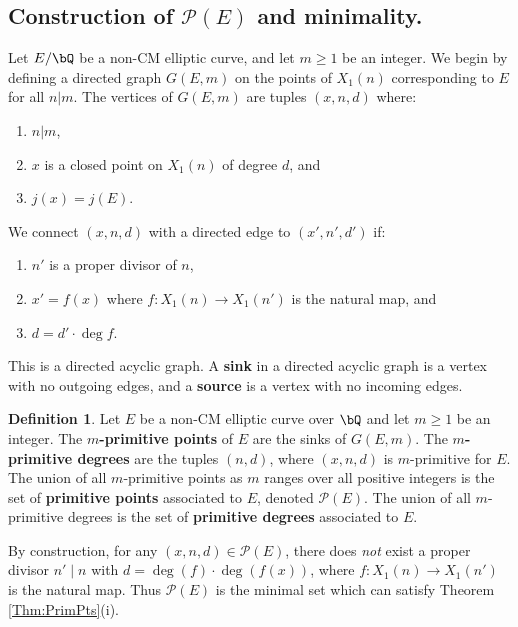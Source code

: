 \documentclass[11pt,reqno]{amsart}
\theoremstyle{plain}
\theoremstyle{definition}
\newtheorem{definition}[theorem]{Definition}
\newcommand{\Q}{\bQ}
\begin{document}
\subsection{\texorpdfstring{Construction of $\mathcal{P}(E)$ and minimality.}{Construction of P(E) and minimality}} Let $E/\Q$ be a non-CM elliptic curve, and let $m\geq 1$ be an integer.
We begin by defining a directed graph $G(E,m)$ on the points of $X_1(n)$ corresponding to $E$ for all $n|m$. The vertices of $G(E,m)$ are tuples $(x,n,d)$ where:
\begin{enumerate}
    \item $n|m$,
    \item $x$ is a closed point on $X_1(n)$ of degree $d$, and
    \item $j(x)=j(E)$.
\end{enumerate}
We connect $(x,n,d)$ with a directed edge to $(x',n',d')$ if:
\begin{enumerate}
    \item $n'$ is a proper divisor of $n$,
    \item $x'=f(x)$ where $f\colon X_1(n)\to X_1(n')$ is the natural map, and
    \item $d=d'\cdot \deg f$.
\end{enumerate}


This is a directed acyclic graph. A \textbf{sink} in a directed acyclic graph is a vertex with no outgoing edges, and a \textbf{source} is a vertex with no incoming edges.

\begin{definition}\label{def:mprimitive}
    Let $E$ be a non-CM elliptic curve over $\Q$ and let $m\geq 1$ be an integer. The \textbf{$m$-primitive points} of $E$ are the sinks of $G(E,m)$. The \textbf{$m$-primitive degrees} are the tuples $(n,d)$, where $(x,n,d)$ is $m$-primitive for $E$. The union of all $m$-primitive points as $m$ ranges over all positive integers is the set of \textbf{primitive points} associated to $E$, denoted $\mathcal{P}(E)$. The union of all $m$-primitive degrees is the set of \textbf{primitive degrees} associated to $E$.
\end{definition}

By construction, for any $(x,n,d) \in \mathcal{P}(E)$, there does \emph{not} exist a proper divisor $n' \mid n$ with $d=\deg(f) \cdot \deg(f(x))$, where $f\colon X_1(n) \rightarrow X_1(n')$ is the natural map. Thus $\mathcal{P}(E)$ is the minimal set which can satisfy Theorem \ref{Thm:PrimPts}(i).
\end{document}
